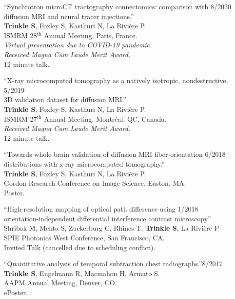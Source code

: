 \documentclass[10pt,letterpaper]{article}
\begin{document}
\begin{benumerate}{17}
\item{``Synchrotron microCT tractography connectomics: comparison with \hfill 8/2020\\ diffusion MRI and neural tracer injections.''\\
    \textbf{Trinkle S}, Foxley S, Kasthuri N, La Rivière P.\\
    ISMRM 28$^{\text{th}}$ Annual Meeting, Paris, France.\\
    \textit{Virtual presentation due to COVID-19 pandemic.}\\
    \textit{Received Magna Cum Laude Merit Award.}\\
    12 minute talk.}

\item{``X-ray microcomputed tomography as a natively isotropic, nondestructive, \hfill 5/2019\\
    3D validation dataset for diffusion MRI.''\\
    \textbf{Trinkle S}, Foxley S, Kasthuri N, La Rivière P.\\
    ISMRM 27$^{\text{th}}$ Annual Meeting, Montr\'eal, QC, Canada.\\
    \textit{Received Magna Cum Laude Merit Award.}\\
    12 minute talk.}
  
\item{``Towards whole-brain validation of diffusion MRI fiber-orientation \hfill 6/2018\\
    distributions with x-ray microcomputed tomography.''\\
    \textbf{Trinkle S}, Foxley S, Kasthuri N, La Rivière P.\\
    Gordon Research Conference on Image Science, Easton, MA. \\
    Poster.}

\item{``High-resolution mapping of optical path difference using \hfill 1/2018\\
    orientation-independent differential interference contrast microscopy'' \\
    Shribak M, Mehta S, Zuckerburg C, Rhines T, \textbf{Trinkle S}, La Rivi\`ere P\\
    SPIE Photonics West Conference, San Francisco, CA. \\
    Invited Talk (cancelled due to scheduling conflict).}
  
\item{``Quantitative analysis of temporal subtraction chest radiographs.''\hfill 8/2017\\
    \textbf{Trinkle S}, Engelmann R, Macmahon H, Armato S. \\
    AAPM Annual Meeting, Denver, CO. \\
    ePoster.}


\end{benumerate}
\end{document}
